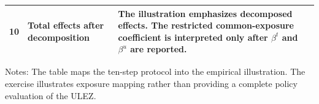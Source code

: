 \begin{table}[!htbp]
\begin{threeparttable}
\begin{tabularx}{\textwidth}{@{}c>{\RaggedRight\arraybackslash}p{}>{\RaggedRight\arraybackslash}X@{}}
10 & Total effects after decomposition & The illustration emphasizes decomposed effects. The restricted common-exposure coefficient is interpreted only after $\beta^t$ and $\beta^u$ are reported. \\
\bottomrule
\end{tabularx}
\begin{tablenotes}[flushleft]
\footnotesize
\item Notes: The table maps the ten-step protocol into the empirical illustration. The exercise illustrates exposure mapping rather than providing a complete policy evaluation of the ULEZ.
\end{tablenotes}
\end{threeparttable}
\end{table}
